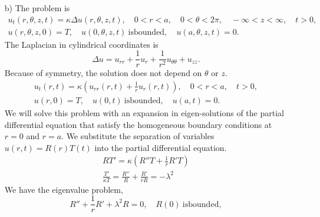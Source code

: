 {\begin{Solution}
\begin{itemize}
    \[
    \lambda_n = \frac{n \pi}{a}, \quad
    Z_n = \sin \left( \frac{ n \pi z }{a} \right), \quad
    n \in \mathbb{N}.
    \]
    The problem for $T$ becomes,
    \[
    T_n' = - \kappa \left( \frac{n \pi}{a} \right)^2 T_n,
    \]
    with the solution,
    \[
    T_n = \exp \left( - \kappa \left( \frac{n\pi}{a} \right)^2 t \right).
    \]
    The eigen-solutions are
    \[
    u_n(z,t) = \sin \left( \frac{n \pi z}{a} \right)
    \exp \left( - \kappa \left( \frac{n\pi}{a} \right)^2 t \right).
    \]
    The solution for $u$ is a linear combination of the eigen-solutions.
    The slowest decaying eigen-solution is
    \[
    u_1(z,t) = \sin \left( \frac{\pi z}{a} \right)
    \exp \left( - \kappa \left( \frac{\pi}{a} \right)^2 t \right).
    \]
    Thus the e-folding time is
    \[
    \boxed{
      \Delta_e = \frac{a^2}{\kappa \pi^2}.
      }
    \]
  \item[b)]
    The problem is
    \begin{gather*}
      u_t(r,\theta,z,t) = \kappa \Delta u(r,\theta,z,t), \quad
      0 < r < a, \quad 0 < \theta < 2 \pi, \quad -\infty < z < \infty, \quad t > 0,\\
      u(r,\theta,z,0) = T, \quad u(0,\theta,z,t)\ \mathrm{is bounded}, \quad 
      u(a,\theta,z,t) = 0.
    \end{gather*}
    The Laplacian in cylindrical coordinates is
    \[
    \Delta u = u_{r r} + \frac{1}{r} u_r + \frac{1}{r^2} u_{\theta\theta} 
    + u_{z z}.
    \]
    Because of symmetry, the solution does not depend on $\theta$ or $z$.
    \begin{gather*}
      u_t(r,t) = \kappa \left( u_{r r}(r,t) + \frac{1}{r} u_r(r,t) \right), \quad
      0 < r < a, \quad t > 0, \\
      u(r,0) = T, \quad u(0,t)\ \mathrm{is bounded}, \quad u(a,t) = 0.
    \end{gather*}
    We will solve this problem with an expansion in eigen-solutions of the 
    partial differential equation that satisfy the homogeneous boundary 
    conditions at $r = 0$ and $r = a$.  We substitute the separation of variables
    $u(r,t) = R(r) T(t)$ into the partial differential equation.
    \begin{gather*}
      R T' = \kappa \left( R'' T + \frac{1}{r} R' T \right) \\
      \frac{T'}{\kappa T} = \frac{R''}{R} + \frac{R'}{r R} = - \lambda^2
    \end{gather*}
    We have the eigenvalue problem,
    \[
    R'' + \frac{1}{r} R' + \lambda^2 R = 0, \quad R(0)\ \mathrm{is bounded}, 
\]
\end{itemize}
\end{Solution}}
